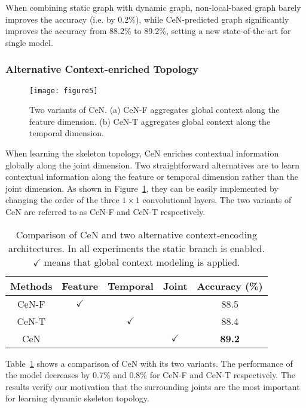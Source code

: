 \documentclass[sigconf]{acmart}
\begin{document}
When combining static graph with dynamic graph, non-local-based graph barely improves the accuracy (i.e. by 0.2\%), while CeN-predicted graph significantly improves the accuracy from 88.2\% to 89.2\%, setting a new state-of-the-art for single model.

\subsubsection{Alternative Context-enriched Topology}

\begin{figure}[t]
  \begin{center}
\texttt{[image: figure5]} \end{center}
\caption{Two variants of CeN. (a) CeN-F aggregates global context along the feature dimension. (b) CeN-T aggregates global context along the temporal dimension.}
\label{fig5}
\end{figure}



When learning the skeleton topology, CeN enriches contextual information globally along the joint dimension. Two straightforward alternatives are to learn contextual information along the feature or temporal dimension rather than the joint dimension. As shown in Figure~\ref{fig5}, they can be easily implemented by changing the order of the three $1\times 1$ convolutional layers. The two variants of CeN are referred to as CeN-F and CeN-T respectively.

\begin{table}[t]
  \caption{Comparison of CeN and two alternative context-encoding architectures. In all experiments the static branch is enabled. $\checkmark$ means that global context modeling is applied.}
  \label{table2}\begin{tabular}{c|c|c|c|c}
    \toprule
    Methods  & Feature & Temporal  & Joint & Accuracy (\%) \\
    \midrule
    CeN-F   & $\checkmark$     &       &       & 88.5  \\
    CeN-T &       & $\checkmark$     &       & 88.4  \\
    CeN &       &       & $\checkmark$     & \textbf{89.2}  \\
    \bottomrule
    \end{tabular}\end{table}

Table~\ref{table2} shows a comparison of CeN with its two variants. The performance of the model decreases by 0.7\% and 0.8\% for CeN-F and CeN-T respectively. The results verify our motivation that the surrounding joints are the most important for learning dynamic skeleton topology.
\end{document}
